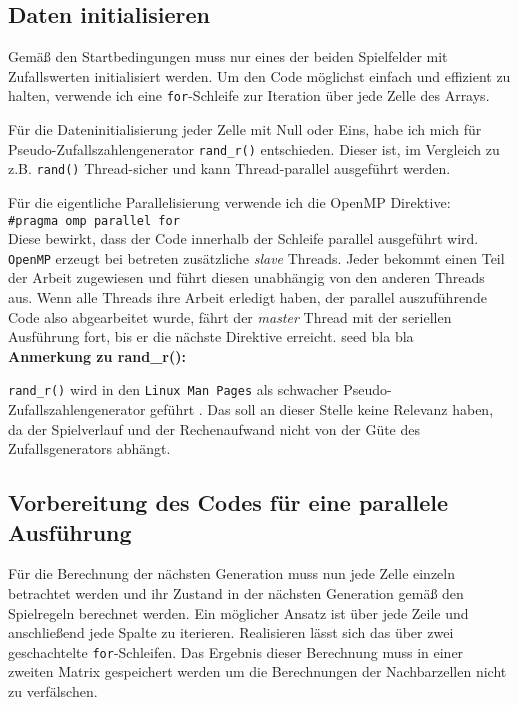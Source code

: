 \documentclass[german,plainarticle,hyperref,utf8]{zihpub}
\begin{document}
	\subsection{Daten initialisieren}
	Gemäß den Startbedingungen muss nur eines der beiden Spielfelder mit Zufallswerten initialisiert werden.
	Um den Code möglichst einfach und effizient zu halten, verwende ich eine \texttt{for}-Schleife zur Iteration über jede Zelle des Arrays.
	
	Für die Dateninitialisierung jeder Zelle mit Null oder Eins, habe ich mich für Pseudo-Zufallszahlengenerator \texttt{rand\_r()} entschieden. Dieser ist, im Vergleich zu z.B. \texttt{rand()} Thread-sicher und kann Thread-parallel ausgeführt werden.
	
	Für die eigentliche Parallelisierung verwende ich die OpenMP Direktive:\\
	
	\texttt{\#pragma omp parallel for}\\
	
	Diese bewirkt, dass der Code innerhalb der Schleife parallel ausgeführt wird. \texttt{OpenMP} erzeugt bei betreten zusätzliche \textit{slave} Threads. Jeder bekommt einen Teil der Arbeit zugewiesen und führt diesen unabhängig von den anderen Threads aus. Wenn alle Threads ihre Arbeit erledigt haben, der parallel auszuführende Code also abgearbeitet wurde, fährt der \textit{master} Thread mit der seriellen Ausführung fort, bis er die nächste Direktive erreicht.
	seed bla bla\\
	
	\textbf{Anmerkung zu rand\_r():}
	
	\texttt{rand\_r()} wird in den \texttt{Linux Man Pages} als schwacher Pseudo-Zufallszahlengenerator geführt \cite{randr}. Das soll an dieser Stelle keine Relevanz haben, da der Spielverlauf und der Rechenaufwand nicht von der Güte des Zufallsgenerators abhängt.
		
	\subsection{Vorbereitung des Codes für eine parallele Ausführung}
	Für die Berechnung der nächsten Generation muss nun jede Zelle einzeln betrachtet werden und ihr Zustand in der nächsten Generation gemäß den Spielregeln berechnet werden.
	Ein möglicher Ansatz ist über jede Zeile und anschließend jede Spalte zu iterieren. Realisieren lässt sich das über zwei geschachtelte \verb|for|-Schleifen. Das Ergebnis dieser Berechnung muss in einer zweiten Matrix gespeichert werden um die Berechnungen der Nachbarzellen nicht zu verfälschen.
	
\end{document}
